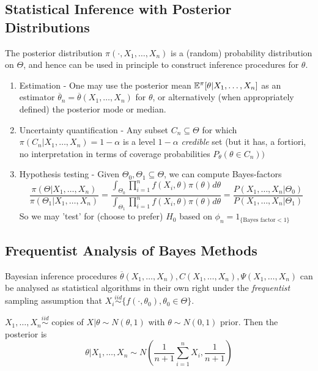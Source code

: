 \documentclass[a4paper]{article}
\begin{document}
\subsection{Statistical Inference with Posterior Distributions}

The posterior distribution $\pi(\cdot, X_1, \ldots, X_n)$ is a (random) probability distribution on $\Theta$, and hence can be used in principle to construct inference procedures for $\theta$.
\begin{enumerate}[label=\roman*)]
	\item Estimation - One may use the posterior mean $\mathbb{E}^{\pi} [\theta | X_1, \ldots, X_n]$ as an estimator $\overline{\theta}_n = \overline{\theta}(X_1, \ldots, X_n)$ for $\theta$, or alternatively (when appropriately  defined) the posterior mode or median.
	\item Uncertainty quantification - Any subset $C_n \subseteq \Theta$ for which $\pi(C_n|X_1, \ldots, X_n) = 1-\alpha$ is a level $1-\alpha$ \textit{credible} set (but it has, a fortiori, no interpretation in terms of coverage probabilities $P_{\theta} (\theta  \in C_n))$ 
	\item Hypothesis testing - Given $\Theta_0, \Theta_1 \subseteq \Theta$, we can compute Bayes-factors
		\[
			\frac{\pi(\Theta | X_1, \ldots, X_n)}{\pi(\Theta_1|X_1, \ldots, X_n)} = \frac{\int_{\Theta_0} \prod_{i=1}^{n} f(X_i, \theta)\pi(\theta)d\theta}{\int_{\Theta_1} \prod_{i=1}^{n}f(X_i, \theta) \pi(\theta) d\theta} = \frac{P\left( X_1, \ldots, X_n | \Theta_0 \right)}{P\left( X_1, \ldots, X_n| \Theta_1 \right)}
		\]
		So we may 'test' for (choose to prefer) $H_0$ based on $\phi_n = 1_{\{\text{Bayes factor} <1\}}$
\end{enumerate}

\subsection{Frequentist Analysis of Bayes Methods}

Bayesian inference procedures $\overline{\theta}(X_1, \ldots, X_n), C(X_1, \ldots, X_n), \Psi(X_1, \ldots, X_n)$ can be analysed as statistical algorithms in their own right under the \textit{frequentist} sampling assumption that $X_i \stackrel{iid}{\sim} \{f(\cdot, \theta_0), \theta_0 \in \Theta\}$.

\begin{eg}
	$X_1, \ldots, X_n \stackrel{iid}{\sim}$ copies of $X|\theta \sim N(\theta, 1)$ with $\theta \sim N(0, 1)$ prior. Then the posterior is
	 \[
		 \theta | X_1, \ldots, X_n \sim N\left( \frac{1}{n+1} \sum_{i=1}^{n}X_i, \frac{1}{n+1} \right) 
	\]
\end{eg}
\end{document}
